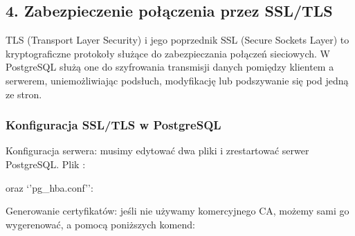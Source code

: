 \documentclass[a4paper,11pt,openany,english]{sphinxmanual}
\begin{document}
\subsection{4. Zabezpieczenie połączenia przez SSL/TLS}
\label{\detokenize{rozdzial2/Bezpieczenstwo/index:zabezpieczenie-polaczenia-przez-ssl-tls}}
\sphinxAtStartPar
TLS (Transport Layer Security) i jego poprzednik SSL (Secure Sockets Layer) to kryptograficzne protokoły służące do zabezpieczania połączeń sieciowych. W PostgreSQL służą one do szyfrowania transmisji danych pomiędzy klientem a serwerem, uniemożliwiając podsłuch, modyfikację lub podszywanie się pod jedną ze stron.


\subsubsection{Konfiguracja SSL/TLS w PostgreSQL}
\label{\detokenize{rozdzial2/Bezpieczenstwo/index:konfiguracja-ssl-tls-w-postgresql}}
\sphinxAtStartPar
Konfiguracja serwera: musimy edytować dwa pliki i zrestartować serwer PostgreSQL. Plik :

\begin{sphinxVerbatim}[commandchars=\\\{\}]
  
  
  
  
  
\end{sphinxVerbatim}

\sphinxAtStartPar
oraz ‘’pg\_hba.conf’’:

\begin{sphinxVerbatim}[commandchars=\\\{\}]
    
\end{sphinxVerbatim}

\sphinxAtStartPar
Generowanie certyfikatów: jeśli nie używamy komercyjnego CA, możemy sami go wygerenować, a pomocą poniższych komend:
\end{document}
